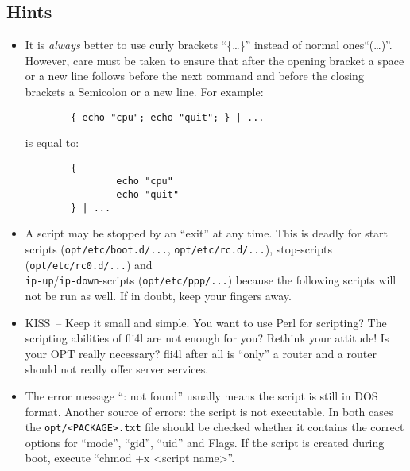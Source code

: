 \subsection{Hints}
\begin{itemize}
\item  It is \emph{always} better to use curly brackets ``\{\ldots\}'' instead of normal
      ones``(\ldots)''. However, care must be taken to ensure
      that after the opening bracket a space or a new line follows before
      the next command and before the closing brackets a Semicolon
      or a new line. For example:

\begin{example}
\begin{verbatim}
        { echo "cpu"; echo "quit"; } | ...
\end{verbatim}
\end{example}

      \noindent is equal to:

\begin{example}
\begin{verbatim}
        {
                echo "cpu"
                echo "quit"
        } | ...
\end{verbatim}
\end{example}


      \item A script may be stopped by an ``exit'' at any time. This is deadly for
	start scripts (\texttt{opt/etc/boot.d/...},
        \texttt{opt/etc/rc.d/...}), stop-scripts (\texttt{opt/etc/rc0.d/...}) and\\
        \texttt{ip-up}/\texttt{ip-down}-scripts (\texttt{opt/etc/ppp/...})
        because the following scripts will not be run as well. If in doubt,
        keep your fingers away.


      \item KISS~-- Keep it small and simple. You want to use Perl for
        scripting? The scripting abilities of fli4l are not enough for you?
        Rethink your attitude! Is your OPT really necessary? fli4l after all
        is ``only'' a router and a router should not really offer server services.


      \item The error message ``: not found'' usually means the script is
        still in DOS format. Another source of errors: the script is not executable.
        In both cases the \texttt{opt/<PACKAGE>.txt} file should be checked whether
        it contains the correct options for ``mode'', ``gid'', ``uid'' and Flags.
        If the script is created during boot, execute ``chmod +x <script name>''.


\end{itemize}
